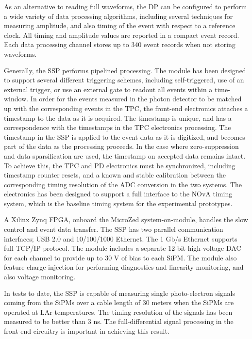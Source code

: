 As an alternative to reading full waveforms, the DP can be configured to 
perform a wide variety of data processing algorithms, 
including several techniques for measuring amplitude, and also timing of 
the event with respect to a reference clock.  
All timing and amplitude values are reported in a compact event record.  
Each data processing channel stores up to 340 event records when not storing waveforms.  

Generally, the SSP performs pipelined processing.  
The module has been designed to support several different triggering schemes, 
including self-triggered, use of an external trigger, or use an 
external gate to readout all events within a time-window.  
In order for the events measured in the photon detector to be matched up 
with the corresponding events in the TPC, the front-end electronics 
attaches a timestamp to the data as it is acquired.  
The timestamp is unique, and has a correspondence with the timestamps in 
the TPC electronics processing.  
The timestamp in the SSP is applied to the event data as it is digitized, 
and becomes part of the data as the processing proceeds.  
In the case where zero-suppression and data sparsification are used, 
the timestamp on accepted data remains intact.  
To achieve this, the TPC and PD electronics must be synchronized, 
including timestamp counter resets, and a known and stable calibration between 
the corresponding timing resolution of the ADC conversion in the two systems.  
The electronics has been designed to support a full interface to the NOvA 
timing system, which is the baseline timing system for the experimental prototypes.

A Xilinx Zynq FPGA, onboard the MicroZed system-on-module, handles the 
slow control and event data transfer.  
The SSP has two parallel communication interfaces; USB 2.0 and 10/100/1000 Ethernet.  
The 1 Gb/s Ethernet supports full TCP/IP protocol.  
The module includes a separate 12-bit high-voltage DAC for each channel to 
provide up to 30 V of bias to each SiPM.  
The module also feature charge injection for performing diagnostics and linearity 
monitoring, and also voltage monitoring.

In tests to date, the SSP is capable of measuring single photo-electron signals 
coming from the SiPMs over a cable length of 30 meters when the SiPMs are 
operated at LAr temperatures.  
The timing resolution of the signals has been measured to be better than 3 ns.  
The full-differential signal processing in the front-end circuitry 
is important in achieving this result.
 
